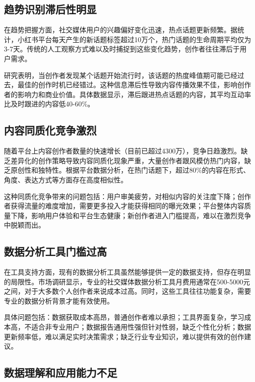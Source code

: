 \documentclass[12pt,a4paper]{article}
\begin{document}
\subsection{趋势识别滞后性明显}

在趋势把握方面，社交媒体用户的兴趣偏好变化迅速，热点话题更新频繁。据统计，小红书平台每天产生的新话题标签超过10万个，热门话题的生命周期平均仅为3-7天。传统的人工观察方式难以及时捕捉到这些变化趋势，创作者往往滞后于用户需求。

研究表明，当创作者发现某个话题开始流行时，该话题的热度峰值期可能已经过去，最佳的创作时机已经错过。这种信息滞后性导致内容传播效果不佳，影响创作者的影响力和商业价值。具体数据显示，滞后跟进热点话题的内容，其平均互动率比及时跟进的内容低40-60\%。

\subsection{内容同质化竞争激烈}

随着平台上内容创作者数量的快速增长（目前已超过4300万），竞争日趋激烈。缺乏差异化的创作策略导致内容同质化现象严重，大量创作者跟风模仿热门内容，缺乏原创性和独特性。根据平台数据分析，在热门话题下，超过80\%的内容在形式、角度、表达方式等方面存在高度相似性。

这种同质化竞争带来的问题包括：用户审美疲劳，对相似内容的关注度下降；创作者获得流量的难度增加，需要更多投入才能获得相同的曝光效果；平台整体内容质量下降，影响用户体验和平台生态健康；新创作者进入门槛提高，难以在激烈竞争中脱颖而出。

\subsection{数据分析工具门槛过高}

在工具支持方面，现有的数据分析工具虽然能够提供一定的数据支持，但存在明显的局限性。市场调研显示，专业的社交媒体数据分析工具月费用通常在500-5000元之间，对于大多数个人创作者来说成本过高。同时，这些工具往往功能复杂，需要专业的数据分析背景才能有效使用。

具体问题包括：数据获取成本高昂，普通创作者难以承担；工具界面复杂，学习成本高，不适合非专业用户；数据报告通用性强但针对性弱，缺乏个性化分析；数据更新频率低，难以满足实时决策需求；缺乏行业专业知识，难以提供有效的创作建议。

\subsection{数据理解和应用能力不足}
\end{document}
